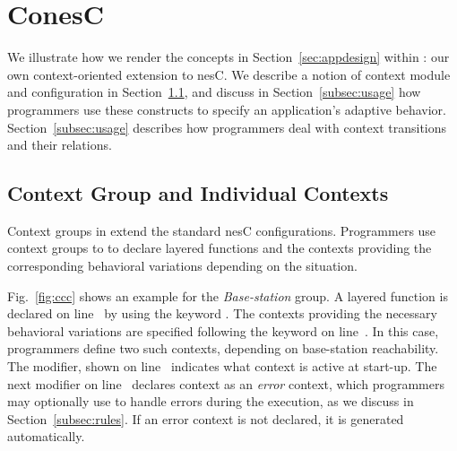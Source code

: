 
\section{ConesC}\label{sec:conesc}


We illustrate how we render the concepts in
Section~\ref{sec:appdesign} within \conesc: our own context-oriented
extension to nesC.  We describe a notion of context module and
configuration in Section~\ref{subsec:components}, and discuss in
Section~\ref{subsec:usage} how programmers use these constructs to
specify an application's adaptive behavior.
Section~\ref{subsec:usage} describes how \conesc programmers deal with
context transitions and their relations.

\subsection{Context Group and Individual Contexts}\label{subsec:components}


Context groups in \conesc extend the standard nesC
configurations. Programmers use context groups to to declare layered
functions and the contexts providing the corresponding behavioral
variations depending on the situation. 

Fig.~\ref{fig:ccc} shows an example for the \emph{Base-station}
group. A layered  function is declared on
line~ by using the keyword . The
contexts providing the necessary behavioral variations are specified
following the keyword  on line~. In
this case, programmers define two such contexts, depending on
base-station reachability. The  modifier, shown on
line~ indicates what context is active at
start-up. The next  modifier on line~
declares context  as an \emph{error} context, which
programmers may optionally use to handle errors during the execution,
as we discuss in Section~\ref{subsec:rules}. If an error context is
not declared, it is generated automatically.

